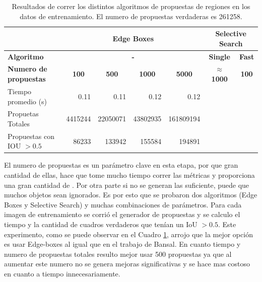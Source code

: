 \begin{table}[]
	\centering
	\resizebox{12.5cm}{!} {
	\begin{tabular}{|l|c|r|r|r|c|r|}
		\hline
		\textbf{}                     & \multicolumn{4}{c|}{\textbf{Edge Boxes}}                                                                                                   & \multicolumn{2}{c|}{\textbf{Selective Search}}               \\ \hline
		\textbf{Algoritmo}            & \multicolumn{4}{c|}{\textbf{-}}                                                                                                            & \textbf{Single}         & \multicolumn{1}{c|}{\textbf{Fast}} \\ \hline
		\textbf{Numero de propuestas} & \textbf{100}                 & \multicolumn{1}{c|}{\textbf{500}} & \multicolumn{1}{c|}{\textbf{1000}} & \multicolumn{1}{c|}{\textbf{5000}} & \textbf{$\approx$ 1000} & \multicolumn{1}{c|}{\textbf{100}}  \\ \hline
		Tiempo promedio (s)           & \multicolumn{1}{r|}{0.11}    & 0.11                              & 0.12                               & 0.12                               & \multicolumn{1}{r|}{}   &                                    \\ \hline
		Propuetas Totales             & \multicolumn{1}{r|}{4415244} & 22050071                          & 43802935                           & 161809194                          & \multicolumn{1}{r|}{}   &                                    \\ \hline
		Propuestas con IOU $> 0.5$    & \multicolumn{1}{r|}{86233}   & 133942                            & 155584                             & 194891                             & \multicolumn{1}{r|}{}   &                                    \\ \hline
	\end{tabular}
}
	\caption{Resultados de correr los distintos algoritmos de propuestas de regiones en los datos de entrenamiento. El numero de propuestas verdaderas es 261258.}
	\label{tab:edgeVSselct}
\end{table}
El numero de propuestas es un parámetro clave en esta etapa, por que gran cantidad de ellas, hace que tome mucho tiempo correr las métricas y proporciona una gran cantidad de . Por otra parte si no se generan las suficiente, puede que muchos objetos sean ignorados. Es por esto que se probaron dos algoritmos (Edge Boxes y Selective Search) y muchas combinaciones de parámetros. Para cada imagen de entrenamiento se corrió el generador de propuestas y se calculo el tiempo y la cantidad de cuadros verdaderos que tenían un IoU $> 0.5$. Este experimento, como se puede observar en el Cuadro \ref{tab:edgeVSselct}, arrojo que la mejor opción es usar Edge-boxes al igual que en el trabajo de Bansal. En cuanto tiempo y numero de propuestas totales resulto mejor usar 500 propuestas ya que al aumentar este numero no se genera mejoras significativas y se hace mas costoso en cuanto a tiempo innecesariamente.\\

